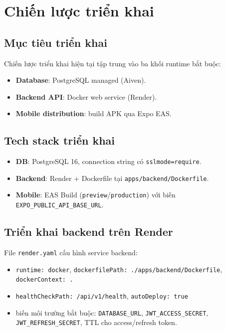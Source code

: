 \section{Chiến lược triển khai}

\subsection{Mục tiêu triển khai}

Chiến lược triển khai hiện tại tập trung vào ba khối runtime bắt buộc:
\begin{itemize}
  \item \textbf{Database}: PostgreSQL managed (Aiven).
  \item \textbf{Backend API}: Docker web service (Render).
  \item \textbf{Mobile distribution}: build APK qua Expo EAS.
\end{itemize}

\subsection{Tech stack triển khai}

\begin{itemize}
  \item \textbf{DB}: PostgreSQL 16, connection string có \texttt{sslmode=require}.
  \item \textbf{Backend}: Render + Dockerfile tại \texttt{apps/backend/Dockerfile}.
  \item \textbf{Mobile}: EAS Build (\texttt{preview}/\texttt{production}) với biến \texttt{EXPO\_PUBLIC\_API\_BASE\_URL}.
\end{itemize}

\subsection{Triển khai backend trên Render}

File \texttt{render.yaml} cấu hình service backend:
\begin{itemize}
  \item \texttt{runtime: docker}, \texttt{dockerfilePath: ./apps/backend/Dockerfile}, \texttt{dockerContext: .}
  \item \texttt{healthCheckPath: /api/v1/health}, \texttt{autoDeploy: true}
  \item biến môi trường bắt buộc: \texttt{DATABASE\_URL}, \texttt{JWT\_ACCESS\_SECRET}, \texttt{JWT\_REFRESH\_SECRET}, TTL cho access/refresh token.
\end{itemize}

